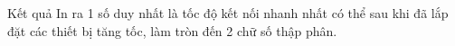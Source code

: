 Kết quả
In ra 1 số duy nhất là tốc độ kết nối nhanh nhất có thể sau khi đã lắp đặt các thiết bị tăng tốc, làm tròn đến 2 chữ số thập phân.